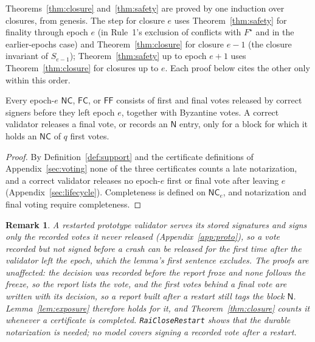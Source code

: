 \documentclass[conference]{IEEEtran}
\newtheorem{remark}{Remark}
\newcommand{\NC}{\mathsf{NC}}
\newcommand{\FC}{\mathsf{FC}}
\newcommand{\FF}{\mathsf{FF}}
\newcommand{\tagN}{\mathsf{N}}
\begin{document}
Theorems~\ref{thm:closure} and~\ref{thm:safety} are proved by one induction over closures, from genesis. The step for closure $e$ uses Theorem~\ref{thm:safety} for finality through epoch $e$ (in Rule~1's exclusion of conflicts with $F^\star$ and in the earlier-epochs case) and Theorem~\ref{thm:closure} for closure $e-1$ (the closure invariant of $S_{e-1}$); Theorem~\ref{thm:safety} up to epoch $e+1$ uses Theorem~\ref{thm:closure} for closures up to $e$. Each proof below cites the other only within this order.

\begin{lemma}
\label{lem:late}
Every epoch-$e$ $\NC$, $\FC$, or $\FF$ consists of first and final votes released by correct signers before they left epoch $e$, together with Byzantine votes. A correct validator releases a final vote, or records an $\tagN$ entry, only for a block for which it holds an $\NC$ of $q$ first votes.
\end{lemma}
\begin{proof}
By Definition~\ref{def:support} and the certificate definitions of Appendix~\ref{sec:voting} none of the three certificates counts a late notarization, and a correct validator releases no epoch-$e$ first or final vote after leaving $e$ (Appendix~\ref{sec:lifecycle}). Completeness is defined on $\NC_e$, and notarization and final voting require completeness.
\end{proof}
\begin{remark}
A restarted prototype validator serves its stored signatures and signs only the recorded votes it never released (Appendix~\ref{app:proto}), so a vote recorded but not signed before a crash can be released for the first time after the validator left the epoch, which the lemma's first sentence excludes. The proofs are unaffected: the decision was recorded before the report froze and none follows the freeze, so the report lists the vote, and the first votes behind a final vote are written with its decision, so a report built after a restart still tags the block $\tagN$. Lemma~\ref{lem:exposure} therefore holds for it, and Theorem~\ref{thm:closure} counts it whenever a certificate is completed. \texttt{RaiCloseRestart} shows that the durable notarization is needed; no model covers signing a recorded vote after a restart.
\end{remark}
\end{document}
